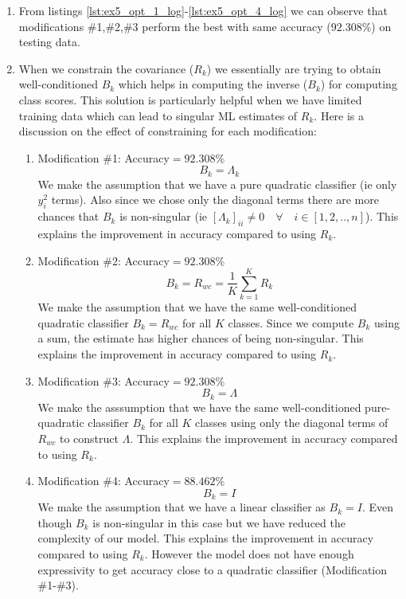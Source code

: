 \documentclass[a4paper,11pt]{article}
\begin{document}
\begin{enumerate}
 \item From listings \ref{lst:ex5_opt_1_log}-\ref{lst:ex5_opt_4_log} we can observe that modifications \#1,\#2,\#3 perform the best with same accuracy ($92.308\%$) on testing data.
 \item When we constrain the covariance ($R_k$) we essentially are trying to obtain well-conditioned $B_k$ which helps in computing the inverse ($B_k$) for computing class scores. This solution is particularly helpful when we have limited training data which can lead to singular ML estimates of $R_k$. Here is a discussion on the effect of constraining for each modification:
 \begin{enumerate}
  \item Modification \#1: Accuracy$=92.308\%$ $$B_k=\Lambda_k$$ We make the assumption that we have a pure quadratic classifier (ie only $y^2_i$ terms). Also since we chose only the diagonal terms there are more chances that $B_k$ is non-singular (ie $[\Lambda_k]_{ii}\neq0 \quad \forall\quad i\in[1,2,..,n]$). This explains the improvement in accuracy compared to using $R_k$.
  
  \item Modification \#2: Accuracy$=92.308\%$ $$B_k=R_{wc}=\frac{1}{K}\sum_{k=1}^{K}R_k$$ We make the assumption that we have the same well-conditioned quadratic classifier $B_k=R_{wc}$ for all $K$ classes. Since we compute $B_k$ using a sum, the estimate has higher chances of being non-singular. This explains the improvement in accuracy compared to using $R_k$.
  
  \item Modification \#3: Accuracy$=92.308\%$ $$B_k=\Lambda$$ We make the asssumption that we have the same well-conditioned pure-quadratic classifier $B_k$ for all $K$ classes using only the diagonal terms of $R_{wc}$ to construct $\Lambda$. This explains the improvement in accuracy compared to using $R_k$.
  
  \item Modification \#4: Accuracy$=88.462\%$ $$B_k=I$$ We make the assumption that we have a linear classifier as $B_k=I$. Even though $B_k$ is non-singular in this case but we have reduced the complexity of our model. This explains the improvement in accuracy compared to using $R_k$. However the model does not have enough expressivity to get accuracy close to a quadratic classifier (Modification \#1-\#3).
\end{enumerate}

\end{enumerate}
\end{document}
